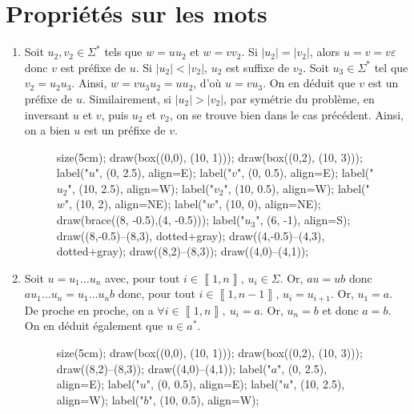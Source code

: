 \section{Propriétés sur les mots}

\begin{enumerate}
	\item Soit $u_2, v_2 \in \Sigma^*$\/ tels que $w = uu_2$\/ et $w = v v_2$. Si $|u_2| = |v_2|$, alors $u = v = v \varepsilon$\/ donc $v$\/ est préfixe de $u$. Si $|u_2| < |v_2|$, $u_2$\/ est suffixe de $v_2$. Soit $u_3 \in \Sigma^*$\/ tel que $v_2 = u_2 u_3$. Ainsi, $w = v u_3 u_2 = u u_2$, d'où $u = vu_3$. On en déduit que $v$\/ est un préfixe de $u$. Similairement, si $|u_2| > |v_2|$, par symétrie du problème, en inversant $u$\/ et $v$, puis $u_2$\/ et $v_2$, on se trouve bien dans le cas précédent. Ainsi, on a bien $u$\/ est un préfixe de $v$.

		\begin{figure}[H]
			\centering
			\begin{asy}
				size(5cm);
				draw(box((0,0), (10, 1)));
				draw(box((0,2), (10, 3)));
				label("$u$", (0, 2.5), align=E);
				label("$v$", (0, 0.5), align=E);
				label("$u_2$", (10, 2.5), align=W);
				label("$v_2$", (10, 0.5), align=W);
				label("$w$", (10, 2), align=NE);
				label("$w$", (10, 0), align=NE);
				draw(brace((8, -0.5),(4, -0.5)));
				label("$u_3$", (6, -1), align=S);
				draw((8,-0.5)--(8,3), dotted+gray);
				draw((4,-0.5)--(4,3), dotted+gray);
				draw((8,2)--(8,3));
				draw((4,0)--(4,1));
			\end{asy}
		\end{figure}

\item Soit $u = u_1\ldots u_n$\/ avec, pour tout $i \in \left\llbracket 1,n \right\rrbracket$, $u_i \in \Sigma$. Or, $au = ub$\/ donc $au_1\ldots u_n = u_1 \ldots u_n b$\/ donc, pour tout $i \in \left\llbracket 1,n-1 \right\rrbracket$, $u_i = u_{i+1}$. Or, $u_1 = a$. De proche en proche, on a $\forall i \in \left\llbracket 1,n \right\rrbracket,\:u_i = a$. Or, $u_n = b$\/ et donc $a = b$. On en déduit également que $u \in a^*$.

		\begin{figure}[H]
			\centering
			\begin{asy}
				size(5cm);
				draw(box((0,0), (10, 1)));
				draw(box((0,2), (10, 3)));
				draw((8,2)--(8,3));
				draw((4,0)--(4,1));
				label("$a$", (0, 2.5), align=E);
				label("$u$", (0, 0.5), align=E);
				label("$u$", (10, 2.5), align=W);
				label("$b$", (10, 0.5), align=W);
			\end{asy}
		\end{figure}


\end{enumerate}
